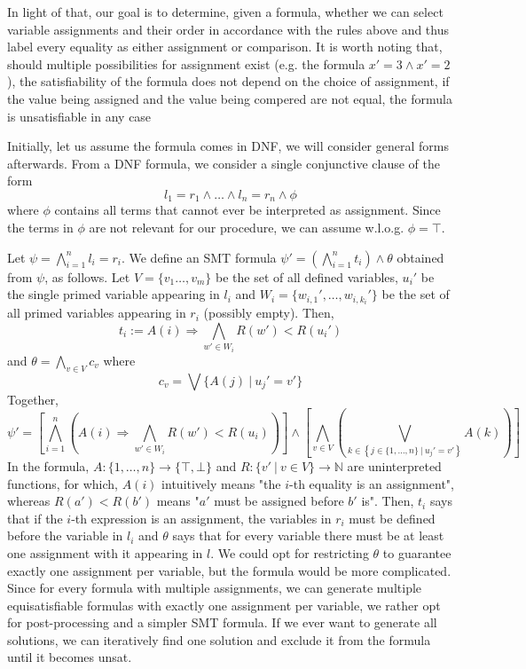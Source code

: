 \documentclass[a4paper, 12pt]{article}
\begin{document}
In light of that, our goal is to determine, given a formula, whether we can select variable assignments and their order in accordance with the rules above and thus label every equality as either assignment or comparison. It is worth noting that, should multiple possibilities for assignment exist (e.g. the formula $x' = 3 \wedge x' =2$), the satisfiability of the formula does not depend on the choice of assignment, if the value being assigned and the value being compered are not equal, the formula is unsatisfiable in any case

Initially, let us assume the formula comes in DNF, we will consider general forms afterwards. From a DNF formula, we consider a single conjunctive clause of the form $$ l_1 = r_1 \wedge \dots \wedge l_n = r_n \wedge \phi$$ where $\phi$ contains all terms that cannot ever be interpreted as assignment. Since the terms in $\phi$ are not relevant for our procedure, we can assume w.l.o.g. $\phi = \top$.

Let $\psi = \bigwedge_{i=1}^n l_i = r_i$. We define an SMT formula $\psi' = \left(\bigwedge_{i=1}^n t_i\right) \wedge \theta$ obtained from $\psi$, as follows.  Let $V = \{v_1 \dots, v_m \}$ be the set of all defined variables, $u_i'$ be the single primed variable appearing in $l_i$ and $W_i = \{w_{i,1}', \dots, w_{i,k_i}'\}$ be the set of all primed variables appearing in $r_i$ (possibly empty).
Then, $$t_i :=  A(i)  \Rightarrow \bigwedge_{w' \in W_i} R(w') < R(u_i')$$ and $\theta = \bigwedge_{v \in V} c_v$
where $$c_v = \bigvee  \{ A(j) \ | \ u_j' = v' \} $$
Together, $$\psi' = \left[ \bigwedge_{i=1}^n \left(A(i) \Rightarrow \bigwedge_{w' \in W_i} R(w') < R(u_i) \right)\right] \wedge \left[ \bigwedge_{v \in V} \left( \bigvee_{ k \in \left\{ j \in \{1,\dots, n \}\ | \ u_j' = v' \right\}} A(k) \right) \right] $$
In the formula, $A \colon \{1, \dots, n\} \to \{\top, \bot\}$ and $R \colon \{v' \ | \ v \in V\} \to \mathbb N$ are uninterpreted functions, for which, $A(i)$ intuitively means "the $i$-th equality is an assignment", whereas $R(a') < R(b')$ means "$a'$ must be assigned before $b'$ is". Then, $t_i$ says that if the $i$-th expression is an assignment, the variables in $r_i$ must be defined before the variable in $l_i$ and $\theta$ says that for every variable there must be at least one assignment with it appearing in $l$. We could opt for restricting $\theta$ to guarantee exactly one assignment per variable, but the formula would be more complicated. Since for every formula with multiple assignments, we can generate multiple equisatisfiable formulas with exactly one assignment per variable, we rather opt for post-processing and a simpler SMT formula. If we ever want to generate all solutions, we can iteratively find one solution and exclude it from the formula until it becomes unsat.
\end{document}
